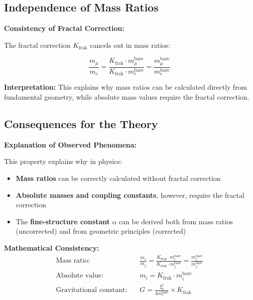 	\subsection{Independence of Mass Ratios}
	
	\begin{keyresult}
		\textbf{Consistency of Fractal Correction:}
		
		The fractal correction $K_{\text{frak}}$ cancels out in mass ratios:
		
		\begin{equation}
			\frac{m_\mu}{m_e} = \frac{K_{\text{frak}} \cdot m_\mu^{\text{bare}}}{K_{\text{frak}} \cdot m_e^{\text{bare}}} = \frac{m_\mu^{\text{bare}}}{m_e^{\text{bare}}}
		\end{equation}
		
		\textbf{Interpretation:} 
		This explains why mass ratios can be calculated directly from fundamental geometry, while absolute mass values require the fractal correction.
	\end{keyresult}
	
	\subsection{Consequences for the Theory}
	
	\begin{derivation}
		\textbf{Explanation of Observed Phenomena:}
		
		This property explains why in physics:
		
		\begin{itemize}
			\item \textbf{Mass ratios} can be correctly calculated without fractal correction
			\item \textbf{Absolute masses and coupling constants}, however, require the fractal correction
			\item The \textbf{fine-structure constant} $\alpha$ can be derived both from mass ratios (uncorrected) and from geometric principles (corrected)
		\end{itemize}
		
		\textbf{Mathematical Consistency:}
		\begin{align}
			\text{Mass ratio:} &\quad \frac{m_i}{m_j} = \frac{K_{\text{frak}} \cdot m_i^{\text{bare}}}{K_{\text{frak}} \cdot m_j^{\text{bare}}} = \frac{m_i^{\text{bare}}}{m_j^{\text{bare}}} \\
			\text{Absolute value:} &\quad m_i = K_{\text{frak}} \cdot m_i^{\text{bare}} \\
			\text{Gravitational constant:} &\quad G = \frac{\xi_0^2}{4 m_e^{\text{bare}}} \times K_{\text{frak}}
		\end{align}
	\end{derivation}
	
